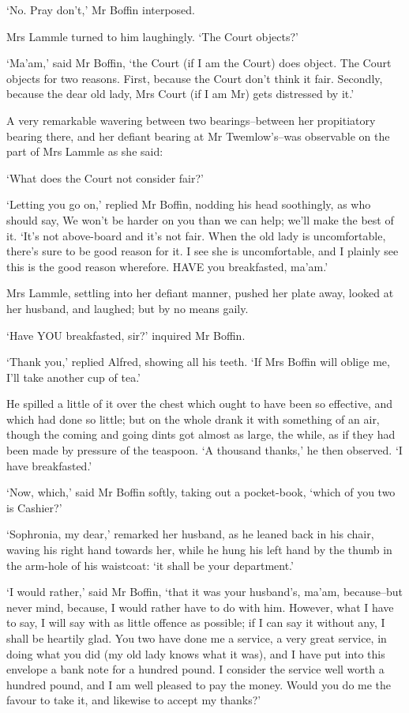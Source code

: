 ‘No. Pray don’t,’ Mr Boffin interposed.

Mrs Lammle turned to him laughingly. ‘The Court objects?’

‘Ma’am,’ said Mr Boffin, ‘the Court (if I am the Court) does object. The
Court objects for two reasons. First, because the Court don’t think it
fair. Secondly, because the dear old lady, Mrs Court (if I am Mr) gets
distressed by it.’

A very remarkable wavering between two bearings--between her
propitiatory bearing there, and her defiant bearing at Mr Twemlow’s--was
observable on the part of Mrs Lammle as she said:

‘What does the Court not consider fair?’

‘Letting you go on,’ replied Mr Boffin, nodding his head soothingly, as
who should say, We won’t be harder on you than we can help; we’ll make
the best of it. ‘It’s not above-board and it’s not fair. When the old
lady is uncomfortable, there’s sure to be good reason for it. I see she
is uncomfortable, and I plainly see this is the good reason wherefore.
HAVE you breakfasted, ma’am.’

Mrs Lammle, settling into her defiant manner, pushed her plate away,
looked at her husband, and laughed; but by no means gaily.

‘Have YOU breakfasted, sir?’ inquired Mr Boffin.

‘Thank you,’ replied Alfred, showing all his teeth. ‘If Mrs Boffin will
oblige me, I’ll take another cup of tea.’

He spilled a little of it over the chest which ought to have been so
effective, and which had done so little; but on the whole drank it with
something of an air, though the coming and going dints got almost as
large, the while, as if they had been made by pressure of the teaspoon.
‘A thousand thanks,’ he then observed. ‘I have breakfasted.’

‘Now, which,’ said Mr Boffin softly, taking out a pocket-book, ‘which of
you two is Cashier?’

‘Sophronia, my dear,’ remarked her husband, as he leaned back in his
chair, waving his right hand towards her, while he hung his left hand
by the thumb in the arm-hole of his waistcoat: ‘it shall be your
department.’

‘I would rather,’ said Mr Boffin, ‘that it was your husband’s, ma’am,
because--but never mind, because, I would rather have to do with him.
However, what I have to say, I will say with as little offence as
possible; if I can say it without any, I shall be heartily glad. You two
have done me a service, a very great service, in doing what you did (my
old lady knows what it was), and I have put into this envelope a bank
note for a hundred pound. I consider the service well worth a hundred
pound, and I am well pleased to pay the money. Would you do me the
favour to take it, and likewise to accept my thanks?’

